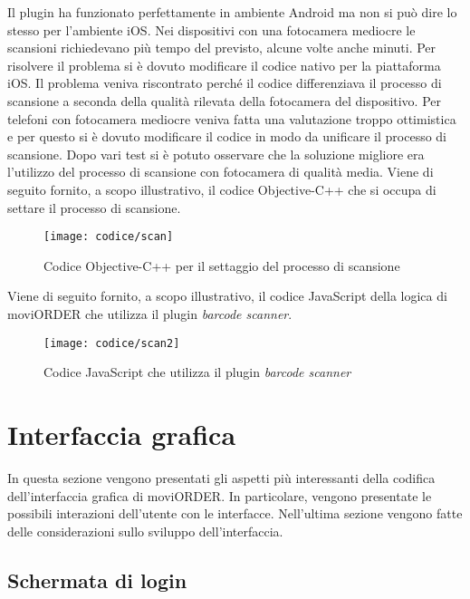 Il plugin ha funzionato perfettamente in ambiente Android ma non si può dire lo stesso per l'ambiente iOS. Nei dispositivi con una fotocamera mediocre le scansioni richiedevano più tempo del previsto, alcune volte anche minuti. Per risolvere il problema si è dovuto modificare il codice nativo per la piattaforma iOS. Il problema veniva riscontrato perché il codice differenziava il processo di scansione a seconda della qualità rilevata della fotocamera del dispositivo. Per telefoni con fotocamera mediocre veniva fatta una valutazione troppo ottimistica e per questo si è dovuto modificare il codice in modo da unificare il processo di scansione. Dopo vari test si è potuto osservare che la soluzione migliore era l'utilizzo del processo di scansione con fotocamera di qualità media. Viene di seguito fornito, a scopo illustrativo, il codice Objective-C++ che si occupa di settare il processo di scansione.

\begin{figure}[!h] 
    \centering 
    \texttt{[image: codice/scan]} 
    \caption{Codice Objective-C++ per il settaggio del processo di scansione}
\end{figure}

Viene di seguito fornito, a scopo illustrativo, il codice JavaScript della logica di moviORDER che utilizza il plugin \textit{barcode scanner}.
\\
\begin{figure}[!h] 
    \centering 
    \texttt{[image: codice/scan2]} 
    \caption{Codice JavaScript che utilizza il plugin \textit{barcode scanner}}
\end{figure}

\newpage

\section{Interfaccia grafica}

In questa sezione vengono presentati gli aspetti più interessanti della codifica dell'interfaccia grafica di moviORDER. In particolare, vengono presentate le possibili interazioni dell'utente con le interfacce. Nell'ultima sezione vengono fatte delle considerazioni sullo sviluppo dell'interfaccia.

\subsection{Schermata di login}

